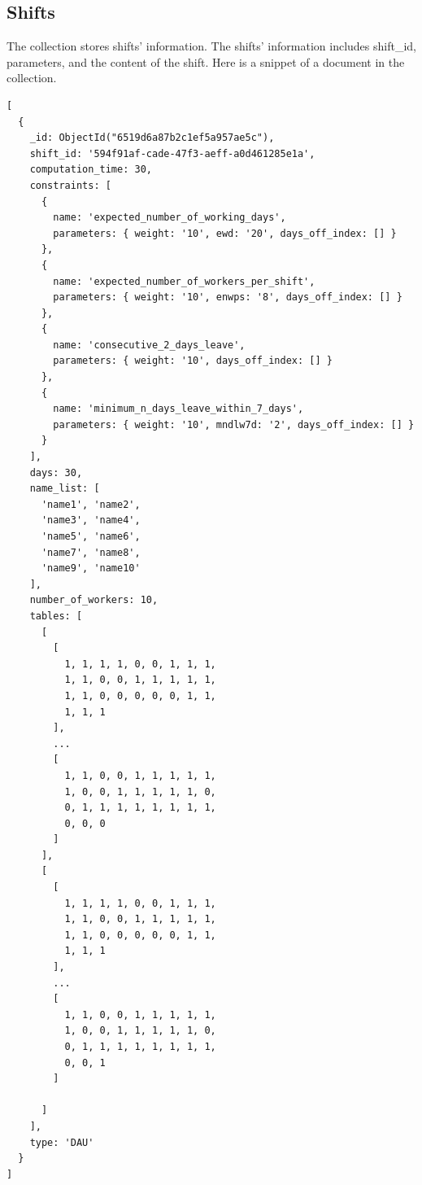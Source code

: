 \documentclass[11pt, oneside]{article}   	%
\begin{document}
\subsection{Shifts}
The collection stores shifts' information. The shifts' information includes shift\_id, parameters, and the content of the shift. Here is a snippet of a document in the collection.
\begin{verbatim}
[
  {
    _id: ObjectId("6519d6a87b2c1ef5a957ae5c"),
    shift_id: '594f91af-cade-47f3-aeff-a0d461285e1a',
    computation_time: 30,
    constraints: [
      {
        name: 'expected_number_of_working_days',
        parameters: { weight: '10', ewd: '20', days_off_index: [] }
      },
      {
        name: 'expected_number_of_workers_per_shift',
        parameters: { weight: '10', enwps: '8', days_off_index: [] }
      },
      {
        name: 'consecutive_2_days_leave',
        parameters: { weight: '10', days_off_index: [] }
      },
      {
        name: 'minimum_n_days_leave_within_7_days',
        parameters: { weight: '10', mndlw7d: '2', days_off_index: [] }
      }
    ],
    days: 30,
    name_list: [
      'name1', 'name2',
      'name3', 'name4',
      'name5', 'name6',
      'name7', 'name8',
      'name9', 'name10'
    ],
    number_of_workers: 10,
    tables: [
      [
        [
          1, 1, 1, 1, 0, 0, 1, 1, 1,
          1, 1, 0, 0, 1, 1, 1, 1, 1,
          1, 1, 0, 0, 0, 0, 0, 1, 1,
          1, 1, 1
        ],
        ...
        [
          1, 1, 0, 0, 1, 1, 1, 1, 1,
          1, 0, 0, 1, 1, 1, 1, 1, 0,
          0, 1, 1, 1, 1, 1, 1, 1, 1,
          0, 0, 0
        ]
      ],
      [
      	[
          1, 1, 1, 1, 0, 0, 1, 1, 1,
          1, 1, 0, 0, 1, 1, 1, 1, 1,
          1, 1, 0, 0, 0, 0, 0, 1, 1,
          1, 1, 1
        ],
        ...
        [
          1, 1, 0, 0, 1, 1, 1, 1, 1,
          1, 0, 0, 1, 1, 1, 1, 1, 0,
          0, 1, 1, 1, 1, 1, 1, 1, 1,
          0, 0, 1
        ]

      ]
    ],
    type: 'DAU'
  }
]
\end{verbatim}
\end{document}

